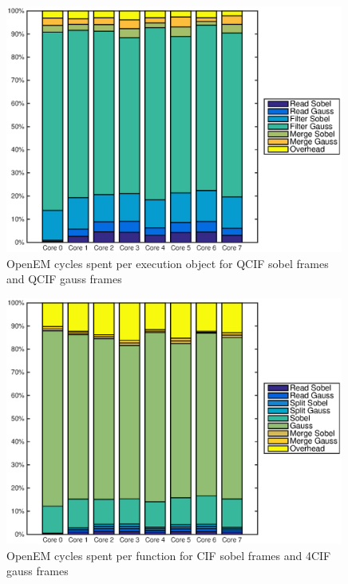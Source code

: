 \begin{figure}[h!]
    \begin{center}
        \includegraphics[width=0.99\textwidth]{images/openem_sobelqcif_gaussqcif_eo.eps}
        \caption{OpenEM cycles spent per execution object for QCIF sobel frames and QCIF gauss frames}
        \label{fig:oem8coreeoqcif}
    \end{center}
\end{figure}

\begin{figure}[h!]
    \begin{center}
        \includegraphics[width=0.99\textwidth]{images/openem_sobelqcif_gaussqcif_func.eps}
        \caption{OpenEM cycles spent per function for CIF sobel frames and 4CIF gauss frames}
        \label{fig:oem8corefuncqcif}
    \end{center}
\end{figure}

